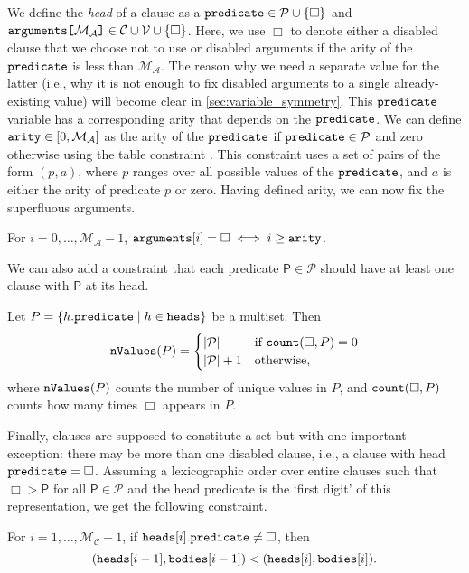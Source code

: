 \documentclass[runningheads]{llncs}
\newcommand{\variable}[1]{\texttt{\textup{#1}}}
\newcommand{\arrayd}[3]{\variable{{#1}[}{#2}\variable{]} \in {#3}}
\newcommand{\predicates}{\mathcal{P}}
\newcommand{\variables}{\mathcal{V}}
\newcommand{\constants}{\mathcal{C}}
\newcommand{\maxArity}{\mathcal{M}_{\mathcal{A}}}
\newcommand{\maxNumClauses}{\mathcal{M}_{\mathcal{C}}}
\begin{document}
We define the \emph{head} of a clause as a $\variable{predicate} \in \predicates{}
\cup \{ \Box \}$ and $\arrayd{arguments}{\maxArity{}}{\constants{} \cup
  \variables{}} \cup \{ \Box \}$. Here, we use $\Box$ to denote either a
disabled clause that we choose not to use or disabled arguments if the arity of
the $\variable{predicate}$ is less than $\maxArity{}$. The reason why we need a
separate value for the latter (i.e., why it is not enough to fix disabled
arguments to a single already-existing value) will become clear in
\cref{sec:variable_symmetry}. This $\variable{predicate}$ variable has a
corresponding arity that depends on the $\variable{predicate}$. We can
define $\variable{arity} \in [0, \maxArity{}]$ as the arity of the
$\variable{predicate}$ if $\variable{predicate} \in \predicates{}$ and zero
otherwise using the table constraint \cite{DBLP:conf/cpaior/MairyDL15}. This
constraint uses a set of pairs of the form $(p, a)$, where $p$ ranges over all
possible values of the $\variable{predicate}$, and $a$ is either the arity of
predicate $p$ or zero. Having defined arity, we can now fix the superfluous
arguments.
\begin{constraint} \label{constr:arity}
  For $i = 0, \dots, \maxArity{} - 1$, $\variable{arguments}[i] = \Box \iff i
  \ge \variable{arity}$.
\end{constraint}
We can also add a constraint that each predicate $\mathsf{P} \in \predicates{}$
should have at least one clause with $\mathsf{P}$ at its head.
\begin{constraint}
  Let $P = \{ h.\variable{predicate} \mid h \in \variable{heads} \}$ be a
  multiset. Then
  \[
    \variable{nValues}(P) = \begin{cases}
      |\predicates{}| & \text{if } \variable{count}(\Box, P) = 0 \\
      |\predicates{}| + 1 & \text{otherwise,}
    \end{cases}
  \]
  where $\variable{nValues}(P)$ counts the number of unique values in $P$, and
  $\variable{count}(\Box, P)$ counts how many times $\Box$ appears in $P$.
\end{constraint}
Finally, clauses are supposed to constitute a set but with one important
exception: there may be more than one disabled clause, i.e., a clause with head
$\variable{predicate} = \Box$. Assuming a lexicographic order over entire
clauses such that $\Box > \mathsf{P}$ for all $\mathsf{P} \in \predicates{}$ and
the head predicate is the `first digit' of this representation, we get the
following constraint.
\begin{constraint}
  For $i = 1, \dots, \maxNumClauses{} - 1$, if $\variable{heads}[i].\variable{predicate}
  \ne \Box$, then
  \[
    (\variable{heads}[i-1], \variable{bodies}[i-1]) < (\variable{heads}[i],
    \variable{bodies}[i]).
  \]
\end{constraint}
\end{document}
